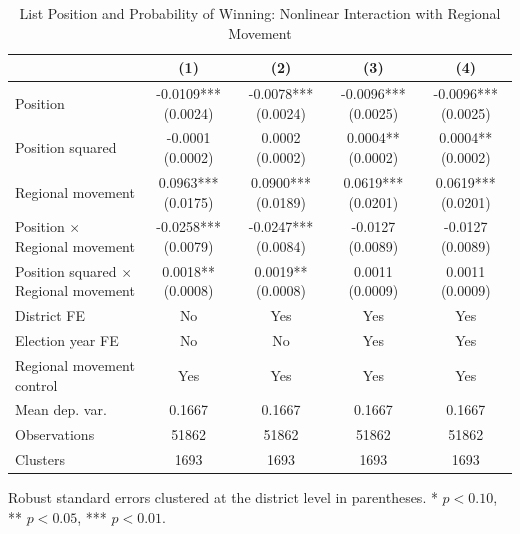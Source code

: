 \begin{table}[htbp]
\centering
\caption{List Position and Probability of Winning: Nonlinear Interaction with Regional Movement}
\label{tab:nonlinear_interaction_specs}
\begin{tabular}{lcccc}
\toprule
 & (1) & (2) & (3) & (4) \\
\midrule
Position & -0.0109*** (0.0024) & -0.0078*** (0.0024) & -0.0096*** (0.0025) & -0.0096*** (0.0025) \\
Position squared & -0.0001 (0.0002) & 0.0002 (0.0002) & 0.0004** (0.0002) & 0.0004** (0.0002) \\
Regional movement & 0.0963*** (0.0175) & 0.0900*** (0.0189) & 0.0619*** (0.0201) & 0.0619*** (0.0201) \\
Position $\times$ Regional movement & -0.0258*** (0.0079) & -0.0247*** (0.0084) & -0.0127 (0.0089) & -0.0127 (0.0089) \\
Position squared $\times$ Regional movement & 0.0018** (0.0008) & 0.0019** (0.0008) & 0.0011 (0.0009) & 0.0011 (0.0009) \\
\midrule
District FE & No & Yes & Yes & Yes \\
Election year FE & No & No & Yes & Yes \\
Regional movement control & Yes & Yes & Yes & Yes \\
Mean dep. var. & 0.1667 & 0.1667 & 0.1667 & 0.1667 \\
Observations & 51862 & 51862 & 51862 & 51862 \\
Clusters & 1693 & 1693 & 1693 & 1693 \\
\bottomrule
\end{tabular}
\begin{flushleft}
\footnotesize Robust standard errors clustered at the district level in parentheses. * $p<0.10$, ** $p<0.05$, *** $p<0.01$.
\end{flushleft}
\end{table}